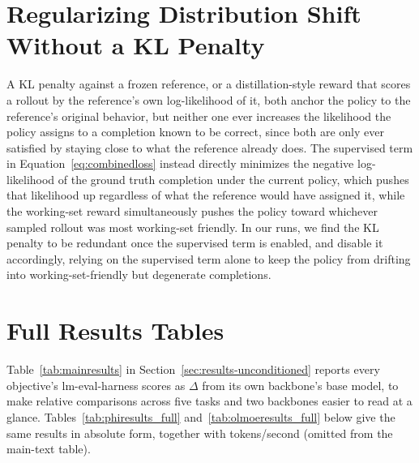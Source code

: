 \documentclass{article}
\begin{document}
\appendix

\section{Regularizing Distribution Shift Without a KL Penalty}
\label{app:sft}

A KL penalty against a frozen reference, or a distillation-style reward that scores a
rollout by the reference's own log-likelihood of it, both anchor the policy to the
reference's original behavior, but neither one ever increases the likelihood the policy
assigns to a completion known to be correct, since both are only ever satisfied by
staying close to what the reference already does. The supervised term in
Equation~\ref{eq:combinedloss} instead directly minimizes the negative log-likelihood of
the ground truth completion under the current policy, which pushes that likelihood up
regardless of what the reference would have assigned it, while the working-set reward
simultaneously pushes the policy toward whichever sampled rollout was most working-set
friendly. In our runs, we find the KL penalty to be redundant once the supervised term
is enabled, and disable it accordingly, relying on the supervised term alone to keep the
policy from drifting into working-set-friendly but degenerate completions.

\section{Full Results Tables}
\label{app:fulltables}

Table~\ref{tab:mainresults} in Section~\ref{sec:results-unconditioned} reports every
objective's lm-eval-harness scores as $\Delta$ from its own backbone's base model, to make
relative comparisons across five tasks and two backbones easier to read at a glance.
Tables~\ref{tab:phiresults_full} and~\ref{tab:olmoeresults_full} below give the same
results in absolute form, together with tokens/second (omitted from the main-text table).
\end{document}
